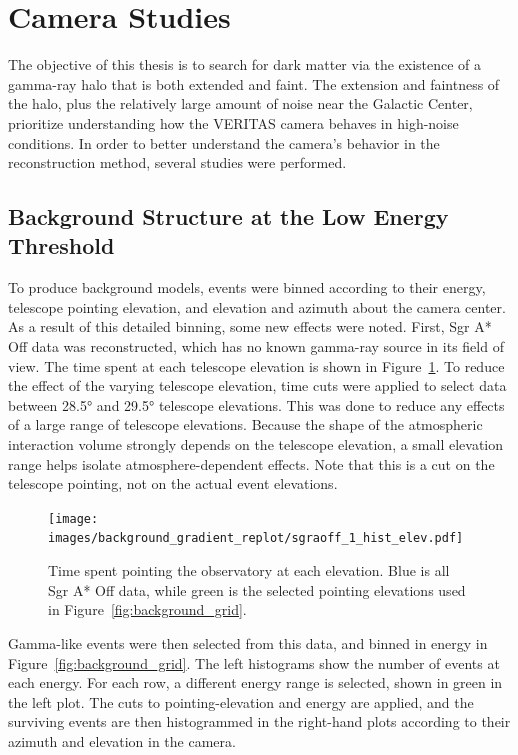   \FloatBarrier

\section{Camera Studies}
The objective of this thesis is to search for dark matter via the existence of a gamma-ray halo that is both extended and faint.
The extension and faintness of the halo, plus the relatively large amount of noise near the Galactic Center, prioritize understanding how the VERITAS camera behaves in high-noise conditions.
In order to better understand the camera's behavior in the reconstruction method, several studies were performed.

\subsection{Background Structure at the Low Energy Threshold}\label{subsec:bkgstructure}
To produce background models, events were binned according to their energy, telescope pointing elevation, and elevation and azimuth about the camera center.
As a result of this detailed binning, some new effects were noted.
First, Sgr A* Off data was reconstructed, which has no known gamma-ray source in its field of view.
The time spent at each telescope elevation is shown in Figure~\ref{fig:back_elevhist}.
To reduce the effect of the varying telescope elevation, time cuts were applied to select data between \ang{28.5} and \ang{29.5} telescope elevations.
This was done to reduce any effects of a large range of telescope elevations.
Because the shape of the atmospheric interaction volume strongly depends on the telescope elevation, a small elevation range helps isolate atmosphere-dependent effects.
Note that this is a cut on the telescope pointing, not on the actual event elevations.

\begin{figure}[bt]
  \centering
  \texttt{[image: images/background\_gradient\_replot/sgraoff\_1\_hist\_elev.pdf]}
  \caption[Elevation Slice of Sgr A* Off Data]{
    Time spent pointing the observatory at each elevation.
    Blue is all Sgr A* Off data, while green is the selected pointing elevations used in Figure~\ref{fig:background_grid}.
  }
  \label{fig:back_elevhist}
\end{figure}
    
Gamma-like events were then selected from this data, and binned in energy in Figure~\ref{fig:background_grid}.
The left histograms show the number of events at each energy.
For each row, a different energy range is selected, shown in green in the left plot.
The cuts to pointing-elevation and energy are applied, and the surviving events are then histogrammed in the right-hand plots according to their azimuth and elevation in the camera.
    
